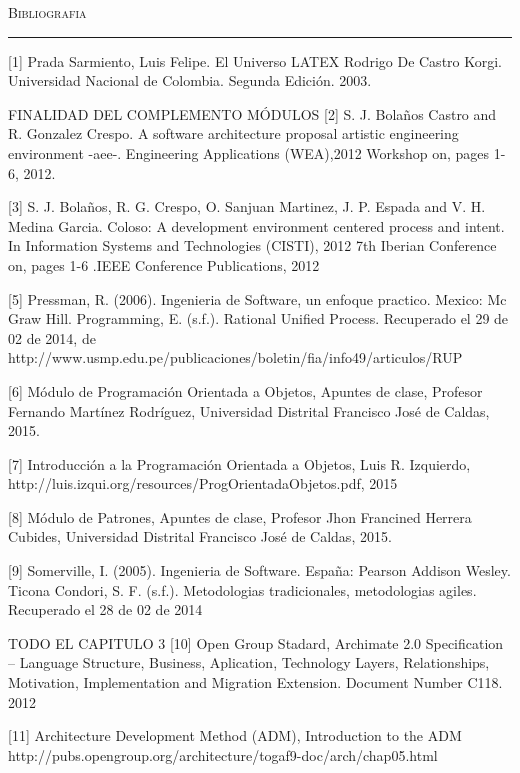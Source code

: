 \thispagestyle{empty}
\vspace*{3cm}
\noindent\Huge\textsc{Bibliografia}\\
\normalsize
\noindent\rule[2pt]{\textwidth}{0.8pt}
\hspace*{3cm}

[1] Prada Sarmiento, Luis Felipe. El Universo LATEX Rodrigo De Castro Korgi. Universidad Nacional de Colombia. Segunda Edición. 2003.

FINALIDAD DEL COMPLEMENTO MÓDULOS
[2] S. J. Bolaños Castro and R. Gonzalez Crespo. A software architecture proposal artistic engineering environment -aee-. Engineering Applications (WEA),2012 Workshop on,	pages 1-6, 2012.

[3] S. J. Bolaños, R. G. Crespo, O. Sanjuan Martinez, J. P. Espada and V. H. Medina Garcia. Coloso: A development environment centered process and intent. In Information Systems and Technologies (CISTI), 2012 7th Iberian Conference on, pages 1-6 .IEEE Conference Publications, 2012

[5] Pressman, R. (2006). Ingenieria de Software, un enfoque practico. Mexico: Mc Graw Hill.
Programming, E. (s.f.). Rational Unified Process. Recuperado el 29 de 02 de 2014, de http://www.usmp.edu.pe/publicaciones/boletin/fia/info49/articulos/RUP%

[6] Módulo de Programación Orientada a Objetos, Apuntes de clase, Profesor Fernando Martínez Rodríguez, Universidad Distrital Francisco José de Caldas, 2015.

[7] Introducción a la Programación Orientada a Objetos, Luis R. Izquierdo, http://luis.izqui.org/resources/ProgOrientadaObjetos.pdf, 2015

[8] Módulo de Patrones, Apuntes de clase, Profesor Jhon Francined Herrera Cubides, Universidad Distrital Francisco José de Caldas, 2015.

[9] Somerville, I. (2005). Ingenieria de Software. España: Pearson Addison Wesley.
Ticona Condori, S. F. (s.f.). Metodologias tradicionales, metodologias agiles. Recuperado el 28 de 02 de 2014

TODO EL CAPITULO 3
[10] Open Group Stadard, Archimate 2.0 Specification – Language Structure, Business, Aplication, Technology Layers, Relationships, Motivation, Implementation and Migration Extension. Document Number C118. 2012

[11] Architecture Development Method (ADM), Introduction to the ADM
http://pubs.opengroup.org/architecture/togaf9-doc/arch/chap05.html


